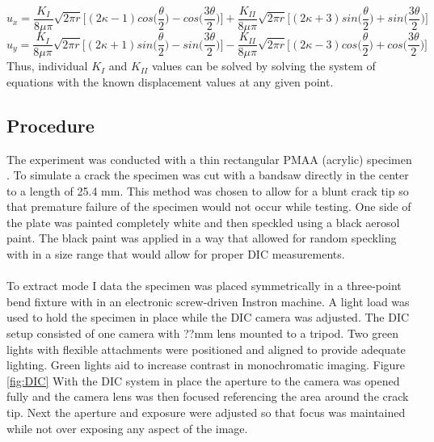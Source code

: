 \documentclass[12pt]{article}
\begin{document}
\begin{equation}
u_{x} = \frac{K_{I}}{8\mu \pi}\sqrt{2\pi r}\bigg[(2\kappa-1)cos\bigg(\frac{\theta}{2}\bigg)-cos\bigg(\frac{3\theta}{2}\bigg)\bigg] + \frac{K_{II}}{8\mu \pi}\sqrt{2\pi r}\bigg[(2\kappa+3)sin\bigg(\frac{\theta}{2}\bigg)+sin\bigg(\frac{3\theta}{2}\bigg)\bigg]
\end{equation}
\begin{equation}
u_{y} = \frac{K_{I}}{8\mu \pi}\sqrt{2\pi r}\bigg[(2\kappa+1)sin\bigg(\frac{\theta}{2}\bigg)-sin\bigg(\frac{3\theta}{2}\bigg)\bigg]-\frac{K_{II}}{8\mu \pi}\sqrt{2\pi r}\bigg[(2\kappa-3)cos\bigg(\frac{\theta}{2}\bigg)+cos\bigg(\frac{3\theta}{2}\bigg)\bigg]
\end{equation}
Thus, individual $K_{I}$ and $K_{II}$ values can be solved by solving the system of equations with the known displacement values at any given point.    
\subsection{Procedure} %
The experiment was conducted with a thin rectangular PMAA (acrylic) specimen .  To simulate a crack the specimen was cut with a bandsaw directly in the center to a length of 25.4 mm. This  method was chosen to allow for a blunt crack tip so that premature failure of the specimen would not occur while testing.  One side of the plate was painted  completely white and then speckled using a black aerosol paint.  The black paint was applied in a way that allowed for random speckling with in a size range that would allow for proper DIC measurements.
\\ \\
To extract mode I data the  specimen was placed symmetrically in a three-point bend fixture with in an electronic screw-driven Instron machine. A light load was used to hold the specimen in place while the DIC camera was adjusted.
The DIC setup consisted of one camera with ??mm lens mounted to a tripod.  Two green lights  with flexible attachments were positioned and aligned to provide adequate lighting. Green lights aid to increase contrast in monochromatic imaging. Figure \ref{fig:DIC} With the DIC system in place the aperture to the camera was opened fully and the camera lens was then focused referencing the area around the crack tip. Next the aperture and exposure were adjusted so that focus was maintained while not over exposing any aspect of the image. 
\\
\\
\end{document}

